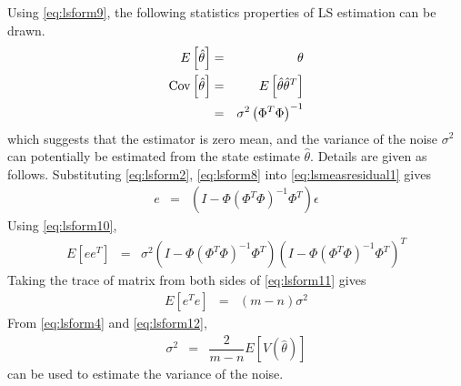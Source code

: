 Using \eqref{eq:lsform9}, the following statistics properties of LS estimation can be drawn.
\begin{eqnarray}
  E\left[\hat{\theta}\right] &=& \theta \nonumber \\
  \textup{Cov}\left[\hat{\theta}\right] &=& E\left[\hat{\theta}\hat{\theta}^T\right] \nonumber \\
  &=& \sigma^2\left(\Phi^T\Phi\right)^{-1} \nonumber
\end{eqnarray}
which suggests that the estimator is zero mean, and the variance of the noise $\sigma^2$ can potentially be estimated from the state estimate $\hat{\theta}$. Details are given as follows. Substituting \eqref{eq:lsform2}, \eqref{eq:lsform8} into \eqref{eq:lsmeasresidual1} gives
\begin{eqnarray}
  e &=& \left(I - \Phi\left(\Phi^T\Phi\right)^{-1}\Phi^T\right)\epsilon \label{eq:lsform10}
\end{eqnarray}
Using \eqref{eq:lsform10},
\begin{eqnarray}
  E\left[ee^T\right] &=& \sigma^2\left(I - \Phi\left(\Phi^T\Phi\right)^{-1}\Phi^T\right)\left(I - \Phi\left(\Phi^T\Phi\right)^{-1}\Phi^T\right)^T \label{eq:lsform11}
\end{eqnarray}
Taking the trace of matrix from both sides of \eqref{eq:lsform11} gives
\begin{eqnarray}
  E\left[e^Te\right] &=& (m-n)\sigma^2 \label{eq:lsform12}
\end{eqnarray}
From \eqref{eq:lsform4} and \eqref{eq:lsform12},
\begin{eqnarray}
  \sigma^2 &=& \dfrac{2}{m-n}E\left[V(\hat{\theta})\right] \nonumber
\end{eqnarray}
can be used to estimate the variance of the noise.







